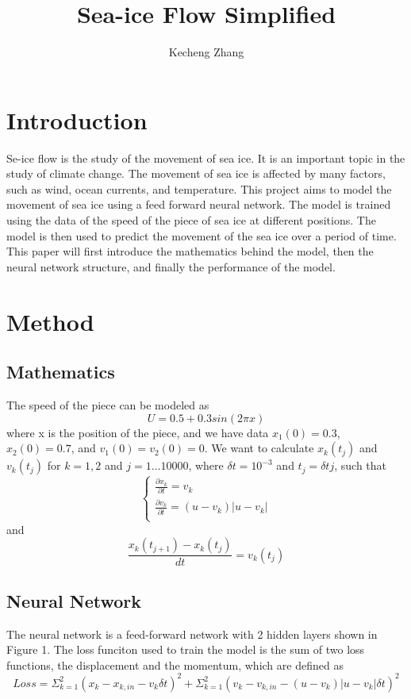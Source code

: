 \documentclass[12pt, a4paper]{article}
\begin{document}
\title{Sea-ice Flow Simplified}
\author{Kecheng Zhang}
\maketitle


\section{Introduction}
Se-ice flow is the study of the movement of sea ice. It is an important topic in the study of climate change. The movement of sea ice is affected by many factors, such as wind, ocean currents, and temperature.
This project aims to model the movement of sea ice using a feed forward neural network. The model is trained using the data of the speed of the piece of sea ice at different positions. The model is then used to predict the movement of the sea ice over a period of time.
This paper will first introduce the mathematics behind the model, then the neural network structure, and finally the performance of the model.
\section{Method}

\subsection{Mathematics}
The speed of the piece can be modeled as
$$ U = 0.5 + 0.3sin(2 \pi x) $$
where x is the position of the piece, and we have data
$x_1(0) = 0.3$, $x_2(0) = 0.7$, and $v_1(0) = v_2(0) = 0$.
We want to calculate
$x_k(t_j)$ and $v_k(t_j)$ for $k = 1, 2$ and $j = 1\dots10000$, where
$\delta t = 10^{-3}$ and $t_j = \delta t j$, such that
$$\begin{cases}
    \frac{\partial x_k}{\partial t} = v_k\\
    \frac{\partial v_k}{\partial t} = (u - v_k) |u - v_k|\\
    \end{cases}$$
and $$ \frac{x_k(t_{j+1}) - x_k(t_j)}{dt} = v_k(t_j)$$

\subsection{Neural Network}
The neural network is a feed-forward network with 2 hidden layers shown in Figure 1. The loss funciton used to train the model is the sum of two loss functions, the displacement and the momentum, which are defined as
$$Loss = \Sigma^2_{k=1}(x_k - x_{k,in} - v_k\delta t)^2 + \Sigma^2_{k=1}(v_k - v_{k,in} - (u - v_k) |u - v_k|\delta t)^2$$
\end{document}
